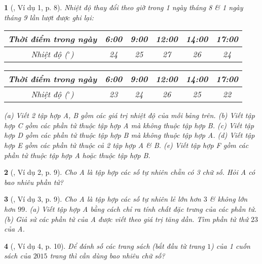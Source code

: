 \documentclass{article}
\newtheorem{baitoan}{}
\begin{document}
\begin{baitoan}[\cite{Binh_boi_duong_Toan_6_tap_1}, Ví dụ 1, p. 8]
	Nhiệt độ thay đổi theo giờ trong 1 ngày tháng 8 \& 1 ngày tháng 9 lần lượt được ghi lại:
	\begin{table}[H]
		\centering
		\begin{tabular}{|c|c|c|c|c|c|}
			\hline
			Thời điểm trong ngày & 6:00 & 9:00 & 12:00 & 14:00 & 17:00 \\
			\hline
			Nhiệt độ (${}^\circ$) & 24 & 25 & 27 & 26 & 24 \\
			\hline
		\end{tabular}
	\end{table}
	\begin{table}[H]
		\centering
		\begin{tabular}{|c|c|c|c|c|c|}
			\hline
			Thời điểm trong ngày & 6:00 & 9:00 & 12:00 & 14:00 & 17:00 \\
			\hline
			Nhiệt độ (${}^\circ$) & 23 & 24 & 26 & 25 & 22 \\
			\hline
		\end{tabular}
	\end{table}
	\noindent(a) Viết 2 tập hợp A, B gồm các giá trị nhiệt độ của mỗi bảng trên. (b) Viết tập hợp C gồm các phần tử thuộc tập hợp A mà không thuộc tập hợp B. (c) Viết tập hợp D gồm các phần tử thuộc tập hợp B mà không thuộc tập hợp A. (d) Viết tập hợp E gồm các phần tử thuộc cả 2 tập hợp A \& B. (e) Viết tập hợp F gồm các phần tử thuộc tập hợp A hoặc thuộc tập hợp B.
\end{baitoan}

\begin{baitoan}[\cite{Binh_boi_duong_Toan_6_tap_1}, Ví dụ 2, p. 9]
	Cho A là tập hợp các số tự nhiên chẵn có 3 chữ số. Hỏi A có bao nhiêu phần tử?
\end{baitoan}

\begin{baitoan}[\cite{Binh_boi_duong_Toan_6_tap_1}, Ví dụ 3, p. 9]
	Cho A là tập hợp các số tự nhiên lẻ lớn hơn $3$ \& không lớn hơn $99$. (a) Viết tập hợp A bằng cách chỉ ra tính chất đặc trưng của các phần tử. (b) Giả sử các phần tử của A được viết theo giá trị tăng dần. Tìm phần tử thứ $23$ của A.
\end{baitoan}

\begin{baitoan}[\cite{Binh_boi_duong_Toan_6_tap_1}, Ví dụ 4, p. 10]
	Để đánh số các trang sách (bắt đầu từ trang $1$) của 1 cuốn sách của $2015$ trang thì cần dùng bao nhiêu chữ số?
\end{baitoan}
\end{document}
